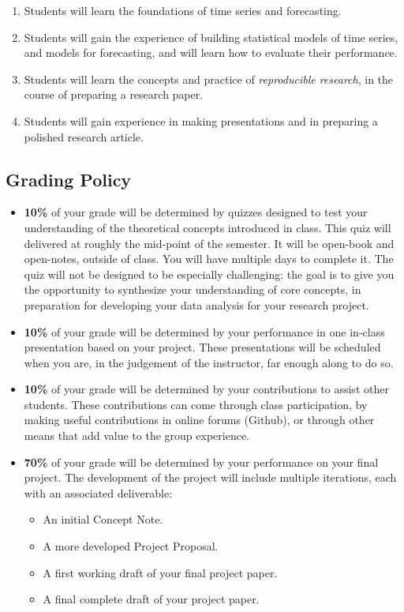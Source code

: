 \documentclass[
]{book}
\providecommand{\tightlist}{%
  \setlength{\itemsep}{0pt}\setlength{\parskip}{0pt}}
\begin{document}
\begin{enumerate}
\def\labelenumi{\arabic{enumi}.}
\item
  Students will learn the foundations of time series and forecasting.
\item
  Students will gain the experience of building statistical models of time series, and models for forecasting, and will learn how to evaluate their performance.
\item
  Students will learn the concepts and practice of \emph{reproducible research}, in the course of preparing a research paper.
\item
  Students will gain experience in making presentations and in preparing a polished research article.
\end{enumerate}

\hypertarget{grading-policy}{%
\subsection*{Grading Policy}\label{grading-policy}}

\begin{itemize}
\item
  \textbf{10\%} of your grade will be determined by quizzes designed to test your understanding of the theoretical concepts introduced in class. This quiz will delivered at roughly the mid-point of the semester. It will be open-book and open-notes, outside of class. You will have multiple days to complete it. The quiz will not be designed to be especially challenging: the goal is to give you the opportunity to synthesize your understanding of core concepts, in preparation for developing your data analysis for your research project.
\item
  \textbf{10\%} of your grade will be determined by your performance in one in-class presentation based on your project. These presentations will be scheduled when you are, in the judgement of the instructor, far enough along to do so.
\item
  \textbf{10\%} of your grade will be determined by your contributions to assist other students. These contributions can come through class participation, by making useful contributions in online forums (Github), or through other means that add value to the group experience.
\item
  \textbf{70\%} of your grade will be determined by your performance on your final project. The development of the project will include multiple iterations, each with an associated deliverable:

  \begin{itemize}
  \tightlist
  \item
    An initial Concept Note.
  \item
    A more developed Project Proposal.
  \item
    A first working draft of your final project paper.
  \item
    A final complete draft of your project paper.
  \end{itemize}
\end{itemize}
\end{document}

